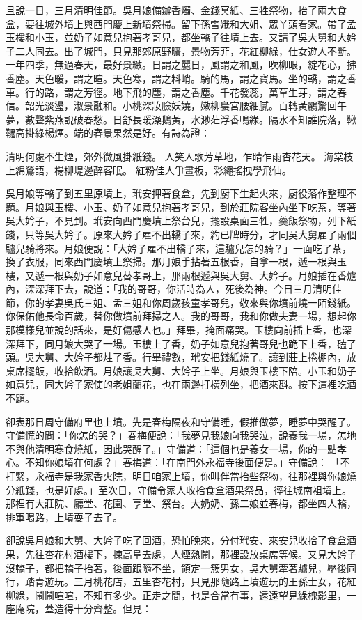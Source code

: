 且說一日，三月清明佳節。吳月娘備辦香燭、金錢冥紙、三牲祭物，抬了兩大食盒，要往城外墳上與西門慶上新墳祭掃。留下孫雪娥和大姐、眾丫頭看家。帶了孟玉樓和小玉，並奶子如意兒抱著孝哥兒，都坐轎子往墳上去。又請了吳大舅和大妗子二人同去。出了城門，只見那郊原野曠，景物芳菲，花紅柳綠，仕女遊人不斷。一年四季，無過春天，最好景緻。日謂之麗日，風謂之和風，吹柳眼，綻花心，拂香塵。天色暖，謂之暄。天色寒，謂之料峭。騎的馬，謂之寶馬。坐的轎，謂之香車。行的路，謂之芳徑。地下飛的塵，謂之香塵。千花發蕊，萬草生芽，謂之春信。韶光淡盪，淑景融和。小桃深妝臉妖嬈，嫩柳裊宮腰細膩。百轉黃鸝驚回午夢，數聲紫燕說破春愁。日舒長暖澡鵝黃，水渺茫浮香鴨綠。隔水不知誰院落，鞦韆高掛綠楊煙。端的春景果然是好。有詩為證：

清明何處不生煙，郊外微風掛紙錢。
人笑人歌芳草地，乍晴乍雨杏花天。
海棠枝上綿鶯語，楊柳堤邊醉客眠。
紅粉佳人爭畫板，彩繩搖拽學飛仙。

吳月娘等轎子到五里原墳上，玳安押著食盒，先到廚下生起火來，廚役落作整理不題。月娘與玉樓、小玉、奶子如意兒抱著孝哥兒，到於莊院客坐內坐下吃茶，等著吳大妗子，不見到。玳安向西門慶墳上祭台兒，擺設桌面三牲，羹飯祭物，列下紙錢，只等吳大妗子。原來大妗子雇不出轎子來，約已牌時分，才同吳大舅雇了兩個驢兒騎將來。月娘便說：「大妗子雇不出轎子來，這驢兒怎的騎？」一面吃了茶，換了衣服，同來西門慶墳上祭掃。那月娘手拈著五根香，自拿一根，遞一根與玉樓，又遞一根與奶子如意兒替孝哥上，那兩根遞與吳大舅、大妗子。月娘插在香爐內，深深拜下去，說道：「我的哥哥，你活時為人，死後為神。今日三月清明佳節，你的孝妻吳氏三姐、孟三姐和你周歲孩童孝哥兒，敬來與你墳前燒一陌錢紙。你保佑他長命百歲，替你做墳前拜掃之人。我的哥哥，我和你做夫妻一場，想起你那模樣兒並說的話來，是好傷感人也。」拜畢，掩面痛哭。玉樓向前插上香，也深深拜下，同月娘大哭了一場。玉樓上了香，奶子如意兒抱著哥兒也跪下上香，磕了頭。吳大舅、大妗子都炷了香。行畢禮數，玳安把錢紙燒了。讓到莊上捲棚內，放桌席擺飯，收拾飲酒。月娘讓吳大舅、大妗子上坐。月娘與玉樓下陪。小玉和奶子如意兒，同大妗子家使的老姐蘭花，也在兩邊打橫列坐，把酒來斟。按下這裡吃酒不題。

卻表那日周守備府里也上墳。先是春梅隔夜和守備睡，假推做夢，睡夢中哭醒了。守備慌的問：「你怎的哭？」春梅便說：「我夢見我娘向我哭泣，說養我一場，怎地不與他清明寒食燒紙，因此哭醒了。」守備道：「這個也是養女一場，你的一點孝心。不知你娘墳在何處？」春梅道：「在南門外永福寺後面便是。」守備說： 「不打緊，永福寺是我家香火院，明日咱家上墳，你叫伴當抬些祭物，往那裡與你娘燒分紙錢，也是好處。」至次日，守備令家人收拾食盒酒果祭品，徑往城南祖墳上。那裡有大莊院、廳堂、花園、享堂、祭台。大奶奶、孫二娘並春梅，都坐四人轎，排軍喝路，上墳耍子去了。

卻說吳月娘和大舅、大妗子吃了回酒，恐怕晚來，分付玳安、來安兒收拾了食盒酒果，先往杏花村酒樓下，揀高阜去處，人煙熱鬧，那裡設放桌席等候。又見大妗子沒轎子，都把轎子抬著，後面跟隨不坐，領定一簇男女，吳大舅牽著驢兒，壓後同行，踏青遊玩。三月桃花店，五里杏花村，只見那隨路上墳遊玩的王孫士女，花紅柳綠，鬧鬧喧喧，不知有多少。正走之間，也是合當有事，遠遠望見綠槐影里，一座庵院，蓋造得十分齊整。但見：

